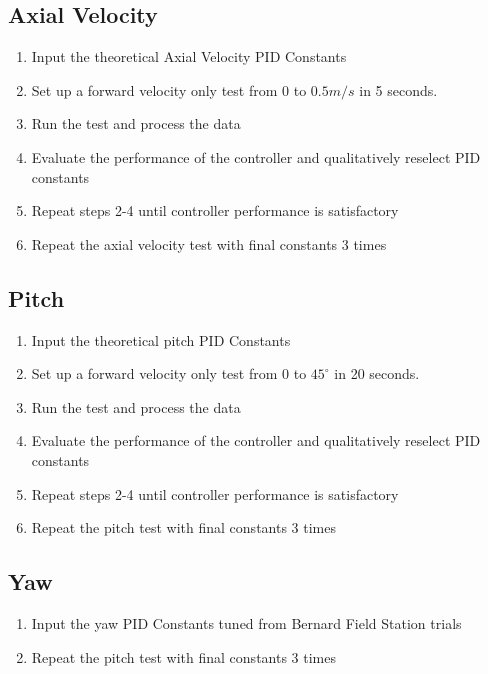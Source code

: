 \documentclass{article}
\begin{document}
\subsection*{Axial Velocity}
\begin{enumerate}
\item Input the theoretical Axial Velocity PID Constants
\item Set up a forward velocity only test from 0 to $0.5 m/s$ in 5 seconds.
\item Run the test and process the data
\item Evaluate the performance of the controller and qualitatively reselect PID constants
\item Repeat steps 2-4 until controller performance is satisfactory
\item Repeat the axial velocity test with final constants 3 times
\end{enumerate}


\subsection*{Pitch}
\begin{enumerate}
\item Input the theoretical pitch PID Constants
\item Set up a forward velocity only test from 0 to $45^\circ $ in 20 seconds.
\item Run the test and process the data
\item Evaluate the performance of the controller and qualitatively reselect PID constants
\item Repeat steps 2-4 until controller performance is satisfactory
\item Repeat the pitch test with final constants 3 times
\end{enumerate}

\subsection*{Yaw}
\begin{enumerate}
\item Input the yaw PID Constants tuned from Bernard Field Station trials
\item Repeat the pitch test with final constants 3 times
\end{enumerate}
\end{document}
